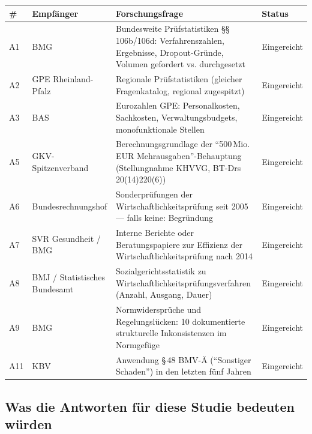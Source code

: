 \documentclass{umbruch-position}
\begin{document}
{\small
\begin{tabularx}{\textwidth}{l l X l}
\toprule
\textbf{\#} & \textbf{Empfänger} & \textbf{Forschungsfrage} & \textbf{Status} \\
\midrule
A1 & BMG & Bundesweite Prüfstatistiken \S\S\,106b/106d: Verfahrenszahlen, Ergebnisse, Dropout-Gründe, Volumen gefordert vs. durchgesetzt & Eingereicht \\
\addlinespace
A2 & GPE Rheinland-Pfalz & Regionale Prüfstatistiken (gleicher Fragenkatalog, regional zugespitzt) & Eingereicht \\
\addlinespace
A3 & BAS & Eurozahlen GPE: Personalkosten, Sachkosten, Verwaltungsbudgets, monofunktionale Stellen & Eingereicht \\
\addlinespace
A5 & GKV-Spitzenverband & Berechnungsgrundlage der ``500\,Mio.\,EUR Mehrausgaben''-Behauptung (Stellungnahme KHVVG, BT-Drs 20(14)220(6)) & Eingereicht \\
\addlinespace
A6 & Bundesrechnungshof & Sonderprüfungen der Wirtschaftlichkeitsprüfung seit 2005 --- falls keine: Begründung & Eingereicht \\
\addlinespace
A7 & SVR Gesundheit / BMG & Interne Berichte oder Beratungspapiere zur Effizienz der Wirtschaftlichkeitsprüfung nach 2014 & Eingereicht \\
\addlinespace
A8 & BMJ / Statistisches Bundesamt & Sozialgerichtsstatistik zu Wirtschaftlichkeitsprüfungsverfahren (Anzahl, Ausgang, Dauer) & Eingereicht \\
\addlinespace
A9 & BMG & Normwidersprüche und Regelungslücken: 10 dokumentierte strukturelle Inkonsistenzen im Normgefüge & Eingereicht \\
\addlinespace
A11 & KBV & Anwendung \S\,48 BMV-Ä (``Sonstiger Schaden'') in den letzten fünf Jahren & Eingereicht \\
\bottomrule
\end{tabularx}
}

\subsection*{Was die Antworten für diese Studie bedeuten würden}
\end{document}
